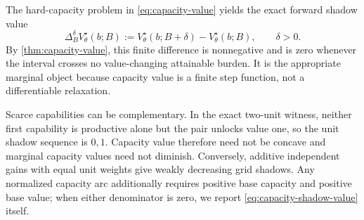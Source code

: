 The hard-capacity problem in \cref{eq:capacity-value} yields the exact
forward shadow value
\begin{equation}\label{eq:capacity-shadow-value}
 \Delta_B^\delta V_\theta^\star(b;B)
 :=V_\theta^\star(b;B+\delta)-V_\theta^\star(b;B),
 \qquad \delta>0.
\end{equation}
By \cref{thm:capacity-value}, this finite difference is nonnegative and is
zero whenever the interval crosses no value-changing attainable burden.  It
is the appropriate marginal object because capacity value is a finite step
function, not a differentiable relaxation.

Scarce capabilities can be complementary.  In the exact two-unit witness,
neither first capability is productive alone but the pair unlocks value one,
so the unit shadow sequence is \(0,1\).  Capacity value therefore need not be
concave and marginal capacity values need not diminish.  Conversely,
additive independent gains with equal unit weights give weakly decreasing
grid shadows.  Any normalized capacity arc additionally requires positive
base capacity and positive base value; when either denominator is zero, we
report \eqref{eq:capacity-shadow-value} itself.
